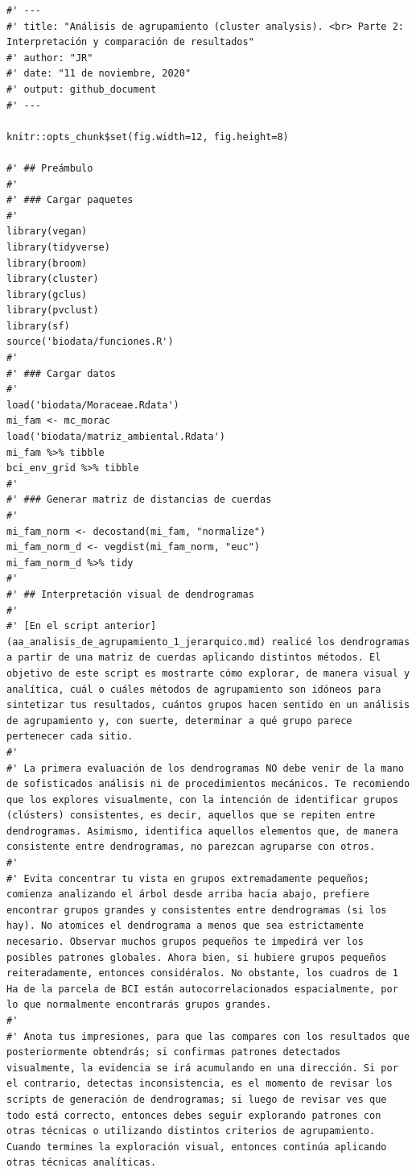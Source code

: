\documentclass[11pt,]{article}
\begin{document}
\begin{verbatim}
#' ---
#' title: "Análisis de agrupamiento (cluster analysis). <br> Parte 2: Interpretación y comparación de resultados"
#' author: "JR"
#' date: "11 de noviembre, 2020"
#' output: github_document
#' ---

knitr::opts_chunk$set(fig.width=12, fig.height=8)

#' ## Preámbulo
#' 
#' ### Cargar paquetes
#' 
library(vegan)
library(tidyverse)
library(broom)
library(cluster)
library(gclus)
library(pvclust)
library(sf)
source('biodata/funciones.R')
#' 
#' ### Cargar datos
#' 
load('biodata/Moraceae.Rdata')
mi_fam <- mc_morac
load('biodata/matriz_ambiental.Rdata')
mi_fam %>% tibble
bci_env_grid %>% tibble
#' 
#' ### Generar matriz de distancias de cuerdas
#' 
mi_fam_norm <- decostand(mi_fam, "normalize")
mi_fam_norm_d <- vegdist(mi_fam_norm, "euc")
mi_fam_norm_d %>% tidy
#' 
#' ## Interpretación visual de dendrogramas
#' 
#' [En el script anterior](aa_analisis_de_agrupamiento_1_jerarquico.md) realicé los dendrogramas a partir de una matriz de cuerdas aplicando distintos métodos. El objetivo de este script es mostrarte cómo explorar, de manera visual y analítica, cuál o cuáles métodos de agrupamiento son idóneos para sintetizar tus resultados, cuántos grupos hacen sentido en un análisis de agrupamiento y, con suerte, determinar a qué grupo parece pertenecer cada sitio.
#' 
#' La primera evaluación de los dendrogramas NO debe venir de la mano de sofisticados análisis ni de procedimientos mecánicos. Te recomiendo que los explores visualmente, con la intención de identificar grupos (clústers) consistentes, es decir, aquellos que se repiten entre dendrogramas. Asimismo, identifica aquellos elementos que, de manera consistente entre dendrogramas, no parezcan agruparse con otros.
#' 
#' Evita concentrar tu vista en grupos extremadamente pequeños; comienza analizando el árbol desde arriba hacia abajo, prefiere encontrar grupos grandes y consistentes entre dendrogramas (si los hay). No atomices el dendrograma a menos que sea estrictamente necesario. Observar muchos grupos pequeños te impedirá ver los posibles patrones globales. Ahora bien, si hubiere grupos pequeños reiteradamente, entonces considéralos. No obstante, los cuadros de 1 Ha de la parcela de BCI están autocorrelacionados espacialmente, por lo que normalmente encontrarás grupos grandes.
#' 
#' Anota tus impresiones, para que las compares con los resultados que posteriormente obtendrás; si confirmas patrones detectados visualmente, la evidencia se irá acumulando en una dirección. Si por el contrario, detectas inconsistencia, es el momento de revisar los scripts de generación de dendrogramas; si luego de revisar ves que todo está correcto, entonces debes seguir explorando patrones con otras técnicas o utilizando distintos criterios de agrupamiento. Cuando termines la exploración visual, entonces continúa aplicando otras técnicas analíticas.

\end{verbatim}
\end{document}
